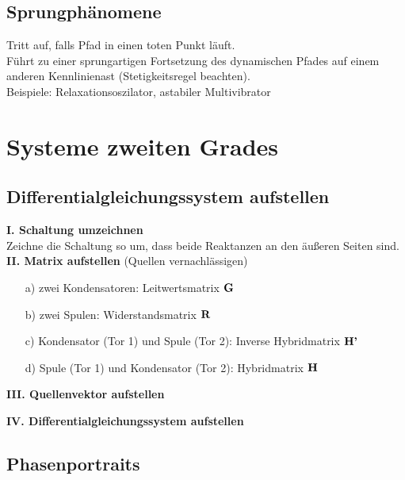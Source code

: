 \documentclass[fs, footer]{latex4ei}
\begin{document}
\begin{multicols*}{4}
\subsection{Sprungphänomene}
Tritt auf, falls Pfad in einen toten Punkt läuft.\\
Führt zu einer sprungartigen Fortsetzung des dynamischen Pfades auf einem anderen Kennlinienast (Stetigkeitsregel beachten).\\
Beispiele: Relaxationsoszilator, astabiler Multivibrator

	
\section{Systeme zweiten Grades}
	\subsection{Differentialgleichungssystem aufstellen}
		\textbf{I. Schaltung umzeichnen}\\
		Zeichne die Schaltung so um, dass beide Reaktanzen an den äußeren Seiten sind.\\
		\textbf{II. Matrix aufstellen}
		(Quellen vernachlässigen)
		\begin{itemize}
		\item[a)] zwei Kondensatoren: Leitwertsmatrix $\textbf{G}$
		\item[b)] zwei Spulen: Widerstandsmatrix $\textbf{R}$
		\item[c)] Kondensator (Tor 1) und Spule (Tor 2): Inverse Hybridmatrix $\textbf{H'}$
		\item[d)] Spule (Tor 1) und Kondensator (Tor 2): Hybridmatrix $\textbf{H}$
		\end{itemize}

		\textbf{III. Quellenvektor aufstellen}

		\textbf{IV. Differentialgleichungssystem aufstellen}
	\subsection{Phasenportraits}

\end{multicols*}
\end{document}
